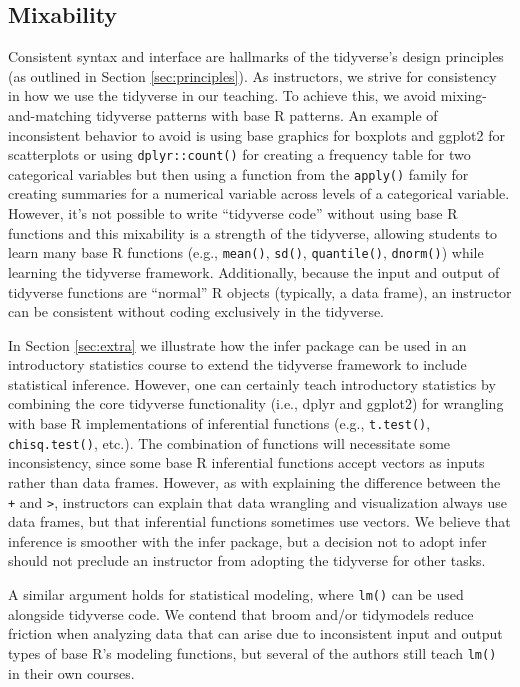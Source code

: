 \documentclass[12pt]{article}
\begin{document}
\hypertarget{sec:mixability}{%
\subsection{Mixability}\label{sec:mixability}}

Consistent syntax and interface are hallmarks of the tidyverse's design
principles (as outlined in Section \ref{sec:principles}). As
instructors, we strive for consistency in how we use the tidyverse in
our teaching. To achieve this, we avoid mixing-and-matching tidyverse
patterns with base R patterns. An example of inconsistent behavior to
avoid is using base graphics for boxplots and ggplot2 for scatterplots
or using \texttt{dplyr::count()} for creating a frequency table for two
categorical variables but then using a function from the
\texttt{apply()} family for creating summaries for a numerical variable
across levels of a categorical variable. However, it's not possible to
write ``tidyverse code'' without using base R functions and this
mixability is a strength of the tidyverse, allowing students to learn
many base R functions (e.g., \texttt{mean()}, \texttt{sd()},
\texttt{quantile()}, \texttt{dnorm()}) while learning the tidyverse
framework. Additionally, because the input and output of tidyverse
functions are ``normal'' R objects (typically, a data frame), an
instructor can be consistent without coding exclusively in the
tidyverse.

In Section \ref{sec:extra} we illustrate how the infer package can be
used in an introductory statistics course to extend the tidyverse
framework to include statistical inference. However, one can certainly
teach introductory statistics by combining the core tidyverse
functionality (i.e., dplyr and ggplot2) for wrangling with base R
implementations of inferential functions (e.g., \texttt{t.test()},
\texttt{chisq.test()}, etc.). The combination of functions will
necessitate some inconsistency, since some base R inferential functions
accept vectors as inputs rather than data frames. However, as with
explaining the difference between the \texttt{+} and
\texttt{\textbar{}\textgreater{}}, instructors can explain that data
wrangling and visualization always use data frames, but that inferential
functions sometimes use vectors. We believe that inference is smoother
with the infer package, but a decision not to adopt infer should not
preclude an instructor from adopting the tidyverse for other tasks.

A similar argument holds for statistical modeling, where \texttt{lm()}
can be used alongside tidyverse code. We contend that broom and/or
tidymodels reduce friction when analyzing data that can arise due to
inconsistent input and output types of base R's modeling functions, but
several of the authors still teach \texttt{lm()} in their own courses.
\end{document}
